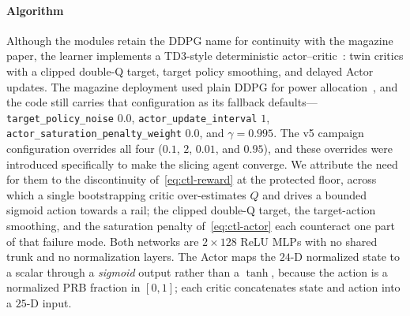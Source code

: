 \paragraph*{Algorithm}
Although the modules retain the DDPG name for continuity with the magazine paper, the learner implements a TD3-style deterministic actor--critic~\cite{fujimoto2018td3}: twin critics with a clipped double-Q target, target policy smoothing, and delayed Actor updates. The magazine deployment used plain DDPG for power allocation~\cite{bao2026llmhric}, and the code still carries that configuration as its fallback defaults---\texttt{target\_policy\_noise} $0.0$, \texttt{actor\_update\_interval} $1$, \texttt{actor\_saturation\_penalty\_weight} $0.0$, and $\gamma=0.995$. The v5 campaign configuration overrides all four ($0.1$, $2$, $0.01$, and $0.95$), and these overrides were introduced specifically to make the slicing agent converge. We attribute the need for them to the discontinuity of~\eqref{eq:ctl-reward} at the protected floor, across which a single bootstrapping critic over-estimates $Q$ and drives a bounded sigmoid action towards a rail; the clipped double-Q target, the target-action smoothing, and the saturation penalty of~\eqref{eq:ctl-actor} each counteract one part of that failure mode. Both networks are $2\times128$ ReLU MLPs with no shared trunk and no normalization layers. The Actor maps the $24$-D normalized state to a scalar through a \emph{sigmoid} output rather than a $\tanh$, because the action is a normalized PRB fraction in $[0,1]$; each critic concatenates state and action into a $25$-D input.

